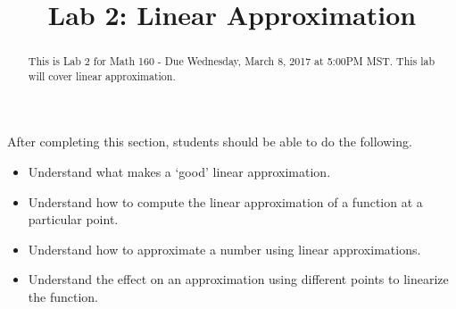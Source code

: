\documentclass{ximera}
\title{Lab 2: Linear Approximation}
\begin{document}
\begin{abstract}
This is Lab 2 for Math 160 - Due Wednesday, March 8, 2017 at 5:00PM MST. This lab will cover linear approximation.
\end{abstract}

\maketitle

\begin{sectionOutcomes}

After completing this section, students should be able to do the following.

\begin{itemize}
    \item Understand what makes a `good' linear approximation.
	\item Understand how to compute the linear approximation of a function at a particular point.
    \item Understand how to approximate a number using linear approximations.
    \item Understand the effect on an approximation using different points to linearize the function.
\end{itemize}

\end{sectionOutcomes}
\end{document}
